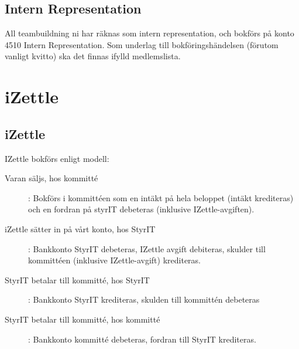 \documentclass{article}
\begin{document}
\subsection{Intern Representation}
All teambuildning ni har räknas som intern representation, och bokförs på konto 4510 Intern Representation. Som underlag till bokföringshändelsen (förutom vanligt kvitto) ska det finnas ifylld medlemslista. 

\section{iZettle}
\subsection{iZettle}
IZettle bokförs enligt modell: 
\begin{description}
    \item [Varan säljs, hos kommitté]: Bokförs i kommittéen som en intäkt på hela beloppet (intäkt krediteras) och en fordran på styrIT debeteras (inklusive IZettle-avgiften). 
    \item [iZettle sätter in på vårt konto, hos StyrIT]: Bankkonto StyrIT debeteras, IZettle avgift debiteras, skulder till kommittéen (inklusive IZettle-avgift) krediteras. 
    \item [StyrIT betalar till kommitté, hos StyrIT]: Bankkonto StyrIT krediteras, skulden till kommittén debeteras
    \item [StyrIT betalar till kommitté, hos kommitté]: Bankkonto kommitté debeteras, fordran till StyrIT krediteras.
\end{description}
\end{document}
